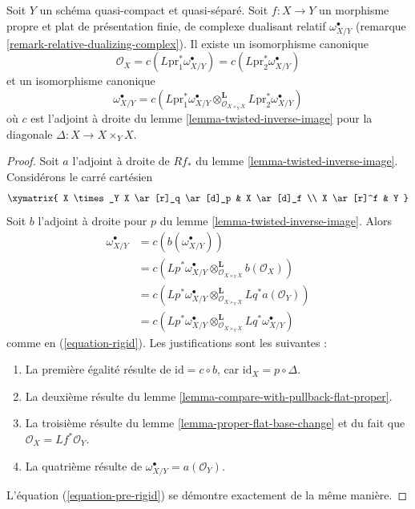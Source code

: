 \begin{lemma}[Rigidité]
\label{lemma-van-den-bergh}
Soit $Y$ un schéma quasi-compact et quasi-séparé. Soit $f : X \to Y$ un morphisme propre et plat de présentation finie, de complexe dualisant relatif $\omega_{X/Y}^\bullet$ (remarque \ref{remark-relative-dualizing-complex}). Il existe un isomorphisme canonique
\begin{equation}
\label{equation-pre-rigid}
\mathcal{O}_X =
c(L\text{pr}_1^*\omega_{X/Y}^\bullet) =
c(L\text{pr}_2^*\omega_{X/Y}^\bullet)
\end{equation}
et un isomorphisme canonique
\begin{equation}
\label{equation-rigid}
\omega_{X/Y}^\bullet =
c\left(L\text{pr}_1^*\omega_{X/Y}^\bullet
\otimes_{\mathcal{O}_{X \times_Y X}}^\mathbf{L}
L\text{pr}_2^*\omega_{X/Y}^\bullet\right)
\end{equation}
où $c$ est l'adjoint à droite du lemme \ref{lemma-twisted-inverse-image} pour la diagonale $\Delta : X \to X \times_Y X$.
\end{lemma}

\begin{proof}
Soit $a$ l'adjoint à droite de $Rf_*$ du lemme \ref{lemma-twisted-inverse-image}. Considérons le carré cartésien
$$
\xymatrix{
X \times_Y X \ar[r]_q \ar[d]_p & X \ar[d]_f \\
X \ar[r]^f & Y
}
$$
Soit $b$ l'adjoint à droite pour $p$ du lemme \ref{lemma-twisted-inverse-image}. Alors
\begin{align*}
\omega_{X/Y}^\bullet
& =
c(b(\omega_{X/Y}^\bullet)) \\
& =
c(Lp^*\omega_{X/Y}^\bullet
\otimes_{\mathcal{O}_{X \times_Y X}}^\mathbf{L} b(\mathcal{O}_X)) \\
& =
c(Lp^*\omega_{X/Y}^\bullet
\otimes_{\mathcal{O}_{X \times_Y X}}^\mathbf{L}
Lq^*a(\mathcal{O}_Y)) \\
& =
c(Lp^*\omega_{X/Y}^\bullet
\otimes_{\mathcal{O}_{X \times_Y X}}^\mathbf{L}
Lq^*\omega_{X/Y}^\bullet)
\end{align*}
comme en (\ref{equation-rigid}). Les justifications sont les suivantes :
\begin{enumerate}
\item La première égalité résulte de $\text{id} = c \circ b$, car $\text{id}_X = p \circ \Delta$.
\item La deuxième résulte du lemme \ref{lemma-compare-with-pullback-flat-proper}.
\item La troisième résulte du lemme \ref{lemma-proper-flat-base-change} et du fait que $\mathcal{O}_X = Lf^*\mathcal{O}_Y$.
\item La quatrième résulte de $\omega_{X/Y}^\bullet = a(\mathcal{O}_Y)$.
\end{enumerate}
L'équation (\ref{equation-pre-rigid}) se démontre exactement de la même manière.
\end{proof}

